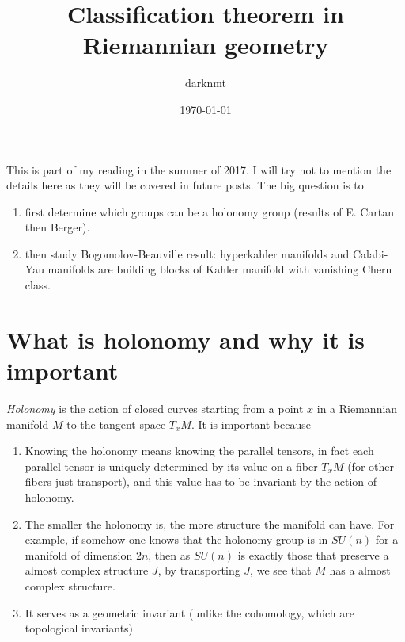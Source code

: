 \documentclass[11pt]{article}
\author{darknmt}
\date{\today}
\title{Classification theorem in Riemannian geometry}
\begin{document}
\maketitle
\tableofcontents

\iffalse
\begin{info}
The PDF version of this page can be downloaded by replacing \texttt{html} in the its address by
\texttt{pdf}. 
For example \texttt{/html/sheaf-cohomology.html} should become \texttt{/pdf/sheaf-cohomology.pdf}.
\end{info}
\fi
\iffalse
\begin{info}
This post is a part of the \href{../res/Stage2017.pdf}{memoire of my M1 internship} at I2M. The memoire contains,
needless to say, less errors than this page.
\end{info}
\fi




This is part of my reading in the summer of 2017. I will try not to mention the details here as they
will be covered in future posts. The big question is to 
\begin{enumerate}
\item first determine which groups can be a holonomy group (results of E. Cartan then Berger).
\item then study Bogomolov-Beauville result: hyperkahler manifolds and Calabi-Yau manifolds are
building blocks of Kahler manifold with vanishing Chern class.
\end{enumerate}

\section{What is holonomy and why it is important}
\label{sec:org5b05145}

\emph{Holonomy} is the action of closed curves starting from a point \(x\) in a Riemannian manifold \(M\) to
the tangent space \(T_xM\). It is important because

\begin{enumerate}
\item Knowing the holonomy means knowing the parallel tensors, in fact each parallel tensor is uniquely
determined by its value on a fiber \(T_xM\) (for other fibers just transport), and this value has
to be invariant by the action of holonomy.
\item The smaller the holonomy is, the more structure the manifold can have. For example, if somehow
one knows that the holonomy group is in \(SU(n)\) for a manifold of dimension \(2n\), then as \(SU(n)\)
is exactly those that preserve a almost complex structure \(J\), by transporting \(J\), we see that
\(M\) has a almost complex structure.
\item It serves as a geometric invariant (unlike the cohomology, which are topological invariants)
\end{enumerate}
\end{document}
